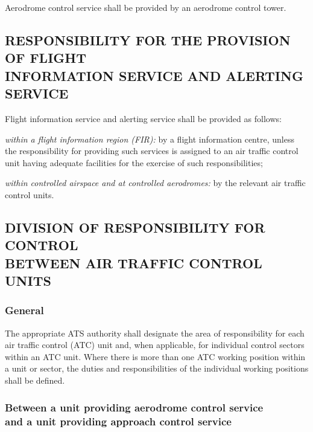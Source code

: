 Aerodrome control service shall be provided by an aerodrome control tower.

\subsection[Responsibility for the provision of flight information service and alerting service]{RESPONSIBILITY FOR THE PROVISION OF FLIGHT \\ INFORMATION SERVICE AND ALERTING SERVICE}

Flight information service and alerting service shall be provided as follows:
\begin{enumalph}
    \item \textit{within a flight information region (FIR):} by a flight information centre, unless the responsibility for providing such services is assigned to an air traffic control unit having adequate facilities for the exercise of such responsibilities;
    \item \textit{within controlled airspace and at controlled aerodromes:} by the relevant air traffic control units.
\end{enumalph}

\subsection[Division of responsibility for control between air traffic control units]{DIVISION OF RESPONSIBILITY FOR CONTROL \\ BETWEEN AIR TRAFFIC CONTROL UNITS}

\subsubsection{General}

The appropriate ATS authority shall designate the area of responsibility for each air traffic control (ATC) unit and, when applicable, for individual control sectors within an ATC unit. Where there is more than one ATC working position within a unit or sector, the duties and responsibilities of the individual working positions shall be defined.

\subsubsection[Between a unit providing aerodrome control service and a unit providing approach control service]{Between a unit providing aerodrome control service \\ and a unit providing approach control service}

